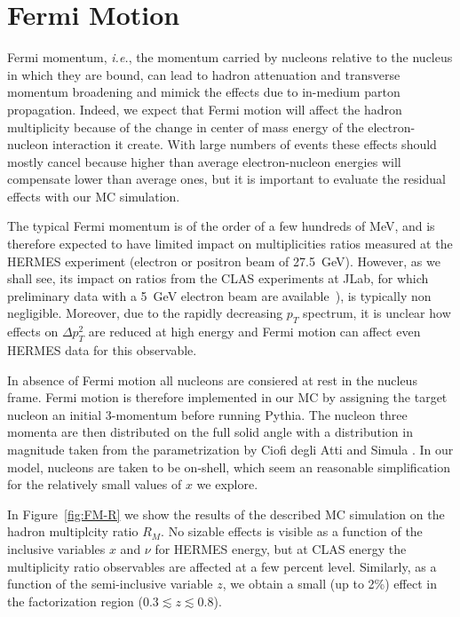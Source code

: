 \section{Fermi Motion}

Fermi momentum, {\em i.e.}, the momentum carried by nucleons relative to the nucleus in which they are bound, can lead to hadron attenuation and transverse momentum broadening and mimick the effects due to in-medium parton propagation.
Indeed, we expect that Fermi motion will affect the hadron multiplicity because of the change in center of mass energy of the electron-nucleon interaction it create. 
With large numbers of events these effects should mostly cancel because higher than average electron-nucleon energies will compensate lower than average ones, but it is important to evaluate the residual effects with our MC simulation. 

The typical Fermi momentum is of the order of a few hundreds of MeV, and is therefore expected to have limited impact on multiplicities ratios measured at the HERMES experiment (electron or positron beam of 27.5~GeV). However, as we shall see, its impact on ratios from the CLAS experiments at JLab, for which preliminary data with a 5~GeV electron beam are available~\cite{Brooks:2009xg}), is typically non negligible. 
Moreover, due to the rapidly decreasing $p_T$ spectrum, it is unclear how effects on $\Delta p_T^2$ are reduced at high energy and Fermi motion can affect even HERMES data for this observable.

In absence of Fermi motion all nucleons are consiered at rest in the nucleus frame. 
Fermi motion is therefore implemented in our MC by assigning the target nucleon an initial 3-momentum before running Pythia. The nucleon three momenta are then distributed on the full solid angle with a distribution in magnitude taken from the parametrization by Ciofi degli Atti and Simula \cite{CiofidegliAtti:1995qe}.
In our model, nucleons are taken to be on-shell, which seem an reasonable simplification for the relatively small values of $x$ we explore.

In Figure~\ref{fig:FM-R} we show the results of the described MC simulation on the hadron multiplcity ratio $R_M$. No sizable effects is visible as a function of the inclusive variables $x$ and $\nu$ for HERMES energy, but at CLAS energy the multiplicity ratio observables are affected at a few percent level. Similarly, as a function of the semi-inclusive variable $z$, we obtain a small (up to 2\%) effect in the factorization region ($0.3 \lesssim z \lesssim0.8$). 

